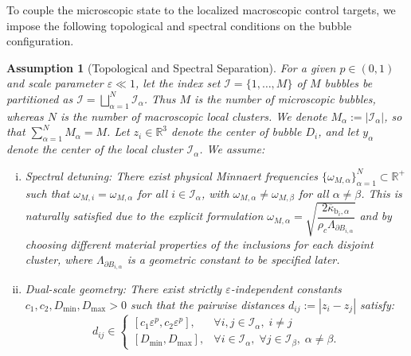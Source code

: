 \documentclass[11pt,a4paper]{article}
\numberwithin{equation}{section}
\newtheorem{assumption}{Assumption}
\begin{document}
\medskip

\noindent
To couple the microscopic state to the localized macroscopic control targets, we impose the following topological and spectral conditions on the bubble configuration.
\begin{assumption}[Topological and Spectral Separation]
\label{assum:dual-scale-geometry}
For a given $p \in (0,1)$ and scale parameter $\varepsilon \ll 1$, let the index set $\mathcal{I} = \{1, \dots, M\}$ of $M$ bubbles be partitioned as $\mathcal{I} = \bigsqcup_{\alpha=1}^N \mathcal{I}_\alpha$. Thus $M$ is the number of microscopic bubbles, whereas $N$ is the number of macroscopic local clusters. We denote $M_\alpha:=|\mathcal I_\alpha|$, so that $\sum_{\alpha=1}^N M_\alpha=M$. Let $z_i \in \mathbb{R}^3$ denote the center of bubble $D_i$, and let $y_\alpha$ denote the center of the local cluster $\mathcal I_\alpha$. We assume:
\begin{enumerate}[(i)]
    \item \textit{Spectral detuning:} There exist physical Minnaert frequencies $\{\omega_{M,\alpha}\}_{\alpha=1}^N \subset \mathbb{R}^+$ such that $\omega_{M,i} = \omega_{M,\alpha}$ for all $i \in \mathcal{I}_\alpha$, with $\omega_{M,\alpha} \neq \omega_{M,\beta}$ for all $\alpha \neq \beta$. This is naturally satisfied due to the explicit formulation $\omega_{M,\alpha} = \sqrt{\dfrac{2 \overline{\kappa}_{\mathrm{b}_i,\alpha}}{\rho_c \Lambda_{\partial B_{i,\alpha}}}}$ and by choosing different material properties of the inclusions for each disjoint cluster, where $\Lambda_{\partial B_{i,\alpha}}$ is a geometric constant to be specified later.
    \item \textit{Dual-scale geometry:} There exist strictly $\varepsilon$-independent constants $c_1, c_2, D_{\min}, D_{\max} > 0$ such that the pairwise distances $d_{ij} := |z_i - z_j|$ satisfy:
    \begin{equation}
        d_{ij} \in 
        \begin{cases} 
        [c_1 \varepsilon^p, c_2 \varepsilon^p], & \forall i, j \in \mathcal{I}_\alpha, \; i \neq j \\[0.5em]
        [D_{\min}, D_{\max}], & \forall i \in \mathcal{I}_\alpha, \; \forall j \in \mathcal{I}_\beta, \; \alpha \neq \beta.
        \end{cases}
    \end{equation}
\end{enumerate}
\end{assumption}

\bigskip
\end{document}
